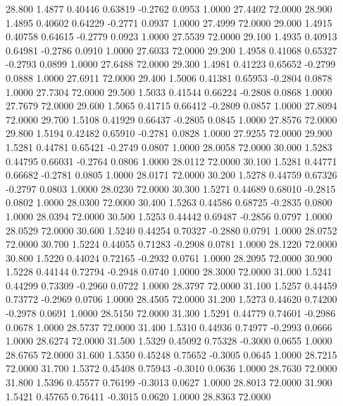   28.800   1.4877   0.40446   0.63819  -0.2762   0.0953   1.0000  27.4402  72.0000
  28.900   1.4895   0.40602   0.64229  -0.2771   0.0937   1.0000  27.4999  72.0000
  29.000   1.4915   0.40758   0.64615  -0.2779   0.0923   1.0000  27.5539  72.0000
  29.100   1.4935   0.40913   0.64981  -0.2786   0.0910   1.0000  27.6033  72.0000
  29.200   1.4958   0.41068   0.65327  -0.2793   0.0899   1.0000  27.6488  72.0000
  29.300   1.4981   0.41223   0.65652  -0.2799   0.0888   1.0000  27.6911  72.0000
  29.400   1.5006   0.41381   0.65953  -0.2804   0.0878   1.0000  27.7304  72.0000
  29.500   1.5033   0.41544   0.66224  -0.2808   0.0868   1.0000  27.7679  72.0000
  29.600   1.5065   0.41715   0.66412  -0.2809   0.0857   1.0000  27.8094  72.0000
  29.700   1.5108   0.41929   0.66437  -0.2805   0.0845   1.0000  27.8576  72.0000
  29.800   1.5194   0.42482   0.65910  -0.2781   0.0828   1.0000  27.9255  72.0000
  29.900   1.5281   0.44781   0.65421  -0.2749   0.0807   1.0000  28.0058  72.0000
  30.000   1.5283   0.44795   0.66031  -0.2764   0.0806   1.0000  28.0112  72.0000
  30.100   1.5281   0.44771   0.66682  -0.2781   0.0805   1.0000  28.0171  72.0000
  30.200   1.5278   0.44759   0.67326  -0.2797   0.0803   1.0000  28.0230  72.0000
  30.300   1.5271   0.44689   0.68010  -0.2815   0.0802   1.0000  28.0300  72.0000
  30.400   1.5263   0.44586   0.68725  -0.2835   0.0800   1.0000  28.0394  72.0000
  30.500   1.5253   0.44442   0.69487  -0.2856   0.0797   1.0000  28.0529  72.0000
  30.600   1.5240   0.44254   0.70327  -0.2880   0.0791   1.0000  28.0752  72.0000
  30.700   1.5224   0.44055   0.71283  -0.2908   0.0781   1.0000  28.1220  72.0000
  30.800   1.5220   0.44024   0.72165  -0.2932   0.0761   1.0000  28.2095  72.0000
  30.900   1.5228   0.44144   0.72794  -0.2948   0.0740   1.0000  28.3000  72.0000
  31.000   1.5241   0.44299   0.73309  -0.2960   0.0722   1.0000  28.3797  72.0000
  31.100   1.5257   0.44459   0.73772  -0.2969   0.0706   1.0000  28.4505  72.0000
  31.200   1.5273   0.44620   0.74200  -0.2978   0.0691   1.0000  28.5150  72.0000
  31.300   1.5291   0.44779   0.74601  -0.2986   0.0678   1.0000  28.5737  72.0000
  31.400   1.5310   0.44936   0.74977  -0.2993   0.0666   1.0000  28.6274  72.0000
  31.500   1.5329   0.45092   0.75328  -0.3000   0.0655   1.0000  28.6765  72.0000
  31.600   1.5350   0.45248   0.75652  -0.3005   0.0645   1.0000  28.7215  72.0000
  31.700   1.5372   0.45408   0.75943  -0.3010   0.0636   1.0000  28.7630  72.0000
  31.800   1.5396   0.45577   0.76199  -0.3013   0.0627   1.0000  28.8013  72.0000
  31.900   1.5421   0.45765   0.76411  -0.3015   0.0620   1.0000  28.8363  72.0000
